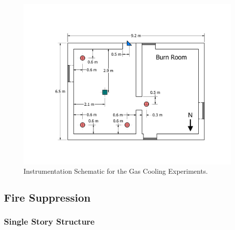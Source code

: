 \documentclass[12pt,oneside]{book}
\begin{document}
\begin{figure}[!ht]
	\includegraphics[width=\columnwidth]{../Figures/Floor_Plans/PDFs/West_Structure/DelCo_2012_West_Structure_Instrumentation}
	\caption{Instrumentation Schematic for the Gas Cooling Experiments.}
	\label{fig:Gas_Cooling_Instrumentation_Dimensions}
\end{figure}

\clearpage

\subsection{Fire Suppression}
\label{subsec:Fire_Suppression_Instrumentation}

\subsubsection*{Single Story Structure}
\end{document}
